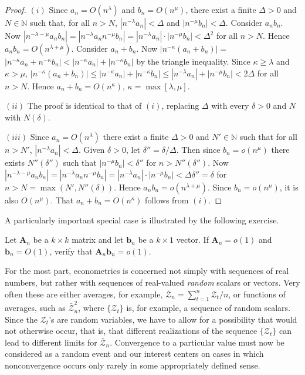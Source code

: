 \begin{proof}
$(i)$ Since $a_n = O(n^{\lambda})$ and $b_n = O(n^{\mu})$, there exist a finite $\Delta > 0$ and
$N \in \mathbb{N}$ such that, for all $n > N$, $|n^{-\lambda}a_n| < \Delta$ and $|n^{-\mu}b_n| < \Delta$. Consider
$a_nb_n$. Now $|n^{-\lambda-\mu}a_nb_n| = |n^{-\lambda}a_nn^{-\mu}b_n| = |n^{-\lambda}a_n| \cdot |n^{-\mu}b_n| < \Delta^2$ for
all $n > N$. Hence $a_nb_n = O(n^{\lambda+\mu})$. Consider $a_n + b_n$. Now $|n^{-\kappa}(a_n+b_n)| =$
$|n^{-\kappa}a_n + n^{-\kappa}b_n| < |n^{-\kappa}a_n| + |n^{-\kappa}b_n|$ by the triangle inequality. Since $\kappa \geq \lambda$
and $\kappa > \mu$, $|n^{-\kappa}(a_n + b_n)| \leq |n^{-\kappa}a_n| + |n^{-\kappa}b_n| \leq |n^{-\lambda}a_n| + |n^{-\mu}b_n| < 2\Delta$
for all $n > N$. Hence $a_n + b_n = O(n^{\kappa})$, $\kappa = \max[\lambda,\mu]$.

$(ii)$ The proof is identical to that of $(i)$, replacing $\Delta$ with every $\delta > 0$
and $N$ with $N(\delta)$.

$(iii)$ Since $a_n = O(n^{\lambda})$ there exist a finite $\Delta > 0$ and $N' \in \mathbb{N}$ such that
for all $n > N'$, $|n^{-\lambda}a_n| < \Delta$. Given $\delta > 0$, let $\delta'' = \delta/\Delta$. Then since
$b_n = o(n^{\mu})$ there exists $N''(\delta'')$ such that $|n^{-\mu}b_n| < \delta''$ for $n > N''(\delta'')$.
Now $|n^{-\lambda-\mu}a_nb_n| = |n^{-\lambda}a_nn^{-\mu}b_n| = |n^{-\lambda}a_n| \cdot |n^{-\mu}b_n| < \Delta\delta'' = \delta$ for
$n > N = \max(N', N''(\delta))$. Hence $a_nb_n = o(n^{\lambda+\mu})$. Since $b_n = o(n^{\mu})$, it is
also $O(n^{\mu})$. That $a_n + b_n = O(n^{\kappa})$ follows from $(i)$.
\end{proof}

A particularly important special case is illustrated by the following exercise.

\begin{exercises}
\item\label{ex:2.8} Let $\mathbf{A}_n$ be a $k \times k$ matrix and let $\mathbf{b}_n$ be a $k \times 1$ vector. If
$\mathbf{A}_n = o(1)$ and $\mathbf{b}_n = O(1)$, verify that $\mathbf{A}_n\mathbf{b}_n = o(1)$.
\end{exercises}

For the most part, econometrics is concerned not simply with sequences
of real numbers, but rather with sequences of real-valued \emph{random} scalars or
vectors. Very often these are either averages, for example, $\bar{\mathcal{Z}}_n = \sum_{t=1}^n \mathcal{Z}_t/n$,
or functions of averages, such as $\bar{\mathcal{Z}}_n^2$, where $\{\mathcal{Z}_t\}$ is, for example, a sequence
of random scalars. Since the $\mathcal{Z}_t$'s are random variables, we have to allow for
a possibility that would not otherwise occur, that is, that different realizations of the sequence $\{\mathcal{Z}_t\}$ can lead to different limits for $\bar{\mathcal{Z}}_n$. Convergence
to a particular value must now be considered as a random event and our interest centers on cases in which nonconvergence occurs only rarely in some
appropriately defined sense.

